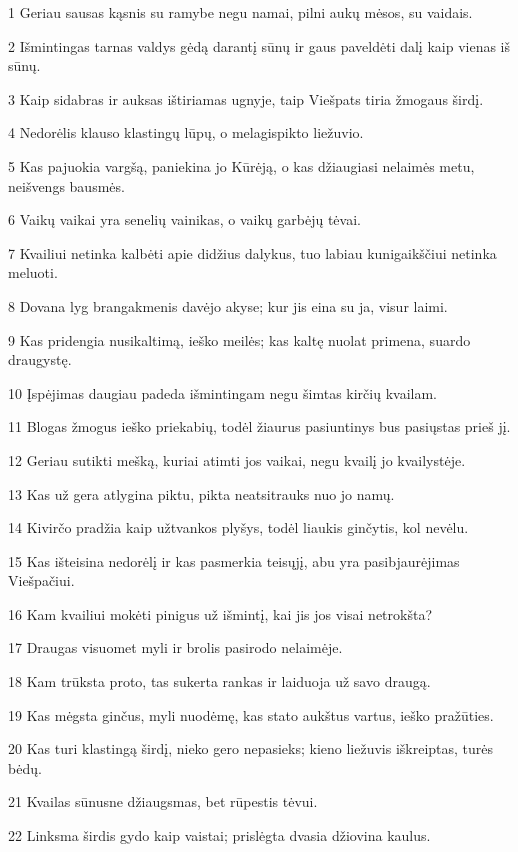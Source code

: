 \par 1 Geriau sausas kąsnis su ramybe negu namai, pilni aukų mėsos, su vaidais. 
\par 2 Išmintingas tarnas valdys gėdą darantį sūnų ir gaus paveldėti dalį kaip vienas iš sūnų. 
\par 3 Kaip sidabras ir auksas ištiriamas ugnyje, taip Viešpats tiria žmogaus širdį. 
\par 4 Nedorėlis klauso klastingų lūpų, o melagis­pikto liežuvio. 
\par 5 Kas pajuokia vargšą, paniekina jo Kūrėją, o kas džiaugiasi nelaimės metu, neišvengs bausmės. 
\par 6 Vaikų vaikai yra senelių vainikas, o vaikų garbė­jų tėvai. 
\par 7 Kvailiui netinka kalbėti apie didžius dalykus, tuo labiau kunigaikščiui netinka meluoti. 
\par 8 Dovana lyg brangakmenis davėjo akyse; kur jis eina su ja, visur laimi. 
\par 9 Kas pridengia nusikaltimą, ieško meilės; kas kaltę nuolat primena, suardo draugystę. 
\par 10 Įspėjimas daugiau padeda išmintingam negu šimtas kirčių kvailam. 
\par 11 Blogas žmogus ieško priekabių, todėl žiaurus pasiuntinys bus pasiųstas prieš jį. 
\par 12 Geriau sutikti mešką, kuriai atimti jos vaikai, negu kvailį jo kvailystėje. 
\par 13 Kas už gera atlygina piktu, pikta neatsitrauks nuo jo namų. 
\par 14 Kivirčo pradžia kaip užtvankos plyšys, todėl liaukis ginčytis, kol nevėlu. 
\par 15 Kas išteisina nedorėlį ir kas pasmerkia teisųjį, abu yra pasibjaurėjimas Viešpačiui. 
\par 16 Kam kvailiui mokėti pinigus už išmintį, kai jis jos visai netrokšta? 
\par 17 Draugas visuomet myli ir brolis pasirodo nelaimėje. 
\par 18 Kam trūksta proto, tas sukerta rankas ir laiduoja už savo draugą. 
\par 19 Kas mėgsta ginčus, myli nuodėmę, kas stato aukštus vartus, ieško pražūties. 
\par 20 Kas turi klastingą širdį, nieko gero nepasieks; kieno liežuvis iškreiptas, turės bėdų. 
\par 21 Kvailas sūnus­ne džiaugsmas, bet rūpestis tėvui. 
\par 22 Linksma širdis gydo kaip vaistai; prislėgta dvasia džiovina kaulus. 
